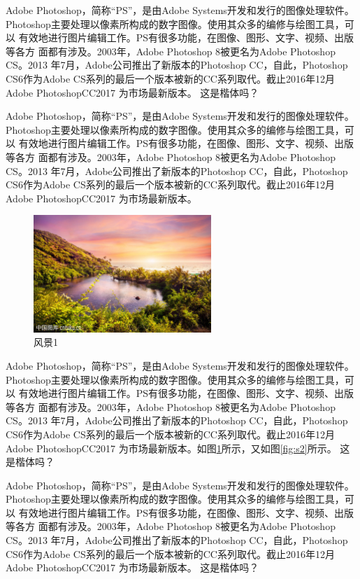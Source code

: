   Adobe Photoshop，简称“PS”，是由Adobe Systems开发和发行的图像处理软件。
 Photoshop主要处理以像素所构成的数字图像。使用其众多的编修与绘图工具，可以
 有效地进行图片编辑工作。PS有很多功能，在图像、图形、文字、视频、出版等各方
 面都有涉及。2003年，Adobe Photoshop 8被更名为Adobe Photoshop CS。2013
 年7月，Adobe公司推出了新版本的Photoshop CC，自此，Photoshop CS6作为Adobe
 CS系列的最后一个版本被新的CC系列取代。截止2016年12月Adobe PhotoshopCC2017
 为市场最新版本。
 {\kaishu 这是楷体吗？}
 
  Adobe Photoshop，简称“PS”，是由Adobe Systems开发和发行的图像处理软件。
 Photoshop主要处理以像素所构成的数字图像。使用其众多的编修与绘图工具，可以
 有效地进行图片编辑工作。PS有很多功能，在图像、图形、文字、视频、出版等各方
 面都有涉及。2003年，Adobe Photoshop 8被更名为Adobe Photoshop CS。2013
 年7月，Adobe公司推出了新版本的Photoshop CC，自此，Photoshop CS6作为Adobe
 CS系列的最后一个版本被新的CC系列取代。截止2016年12月Adobe PhotoshopCC2017
 为市场最新版本。
	\begin{figure}[!ht]
		\begin{center}
		\setlength{\belowcaptionskip}{10pt}
		\includegraphics[width=0.6\textwidth]{images/img1.jpg}
		\caption{风景1}\label{fig:s1}
		\end{center}
	\end{figure}
  Adobe Photoshop，简称“PS”，是由Adobe Systems开发和发行的图像处理软件。
 Photoshop主要处理以像素所构成的数字图像。使用其众多的编修与绘图工具，可以
 有效地进行图片编辑工作。PS有很多功能，在图像、图形、文字、视频、出版等各方
 面都有涉及。2003年，Adobe Photoshop 8被更名为Adobe Photoshop CS。2013
 年7月，Adobe公司推出了新版本的Photoshop CC，自此，Photoshop CS6作为Adobe
 CS系列的最后一个版本被新的CC系列取代。截止2016年12月Adobe PhotoshopCC2017
 为市场最新版本。如图\ref{fig:s1}所示，又如图\ref{fig:s2}所示。
 {\kaishu 这是楷体吗？}
 
  Adobe Photoshop，简称“PS”，是由Adobe Systems开发和发行的图像处理软件。
 Photoshop主要处理以像素所构成的数字图像。使用其众多的编修与绘图工具，可以
 有效地进行图片编辑工作。PS有很多功能，在图像、图形、文字、视频、出版等各方
 面都有涉及。2003年，Adobe Photoshop 8被更名为Adobe Photoshop CS。2013
 年7月，Adobe公司推出了新版本的Photoshop CC，自此，Photoshop CS6作为Adobe
 CS系列的最后一个版本被新的CC系列取代。截止2016年12月Adobe PhotoshopCC2017
 为市场最新版本。
 {\kaishu 这是楷体吗？}
 
